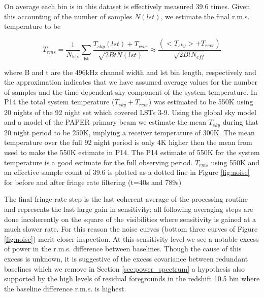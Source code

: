 \documentclass[preprint]{aastex}
\begin{document}
On average each bin is in this dataset is effectively measured 39.6 times. Given this accounting of the number of samples $N(lst)$, we estimate the final r.m.s. temperature to be


\[
T_{rms}  =\frac{1}{N_{\textrm{lsts}}}\sum_{\textrm{lst}} \frac{T_{sky}(lst) + T_{rcvr}}{\sqrt{2BtN(lst)}} \approx \frac{(<T_{sky}> + T_{rcvr})}{\sqrt{2BtN_{eff}}}
\label{eq:Trms}
\]


where B and t are the 496kHz channel width and lst bin length, respectively and the approximation indicates that we have assumed average values for the number of samples and the time dependent sky component of the system temperature.  In P14 the total system temperature ($T_{sky} + T_{rcvr}$) was estimated to be 550K using 20 nights of the 92 night set which covered LSTs 3-9. Using the global sky model  \citep{deOliveiraCosta:2008p2242} and a model of the PAPER primary beam we estimate the mean $T_{sky}$ during that 20 night period to be 250K, implying a receiver temperature of 300K.  The mean temperature over the full 92 night period is only 4K higher then the mean from used to make the 550K estimate in P14. The P14 estimate of 550K for the system temperature is a good estimate for the full observing period.  $T_{rms}$ using 550K and an effective sample count of 39.6  is plotted as a dotted line in Figure \ref{fig:noise} for before and after fringe rate filtering (t=40s and 789s)


The final fringe-rate step is the last coherent average of the processing routine and represents the last large gain in sensitivity; all following averaging steps are done incoherently on the square of the visibilities where sensitivity is gained at a much slower rate. For this reason the noise curves (bottom three curves of Figure \ref{fig:noise})  merit closer inspection.  At this sensitivity level we see a notable excess of power in the r.m.s. difference between baselines. Though the cause of this excess is unknown, it is suggestive of the excess covariance between redundant baselines which we remove in Section \ref{sec:power_spectrum} a hypothesis also supported by the high levels of residual foregrounds in the redshift 10.5 bin where the baseline difference r.m.s. is highest.
\end{document}
